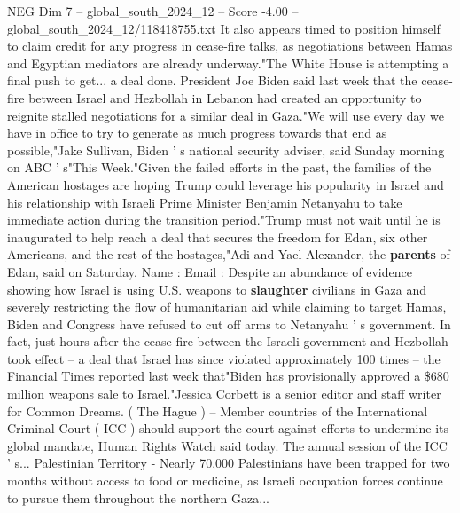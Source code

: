 \begin{textsample}{NEG Dim 7 – global\_south\_2024\_12 – Score -4.00 – global\_south\_2024\_12/118418755.txt}
It also appears timed to position himself to claim credit for any progress in cease-fire talks, as negotiations between Hamas and Egyptian mediators are already underway."The White House is attempting a final push to get... a deal done.
President Joe Biden said last week that the cease-fire between Israel and Hezbollah in Lebanon had created an opportunity to reignite stalled negotiations for a similar deal in Gaza."We will use every day we have in office to try to generate as much progress towards that end as possible,"Jake Sullivan, Biden ' s national security adviser, said Sunday morning on ABC ' s"This Week."Given the failed efforts in the past, the families of the American hostages are hoping Trump could leverage his popularity in Israel and his relationship with Israeli Prime Minister Benjamin Netanyahu to take immediate action during the transition period."Trump must not wait until he is inaugurated to help reach a deal that secures the freedom for Edan, six other Americans, and the rest of the hostages,"Adi and Yael Alexander, the \textbf{parents} of Edan, said on Saturday.
Name : Email : Despite an abundance of evidence showing how Israel is using U.S. weapons to \textbf{slaughter} civilians in Gaza and severely restricting the flow of humanitarian aid while claiming to target Hamas, Biden and Congress have refused to cut off arms to Netanyahu ' s government.
In fact, just hours after the cease-fire between the Israeli government and Hezbollah took effect -- a deal that Israel has since violated approximately 100 times -- the Financial Times reported last week that"Biden has provisionally approved a \$680 million weapons sale to Israel."Jessica Corbett is a senior editor and staff writer for Common Dreams. ( The Hague ) -- Member countries of the International Criminal Court ( ICC ) should support the court against efforts to undermine its global mandate, Human Rights Watch said today.
The annual session of the ICC ' s...
Palestinian Territory - Nearly 70,000 Palestinians have been trapped for two months without access to food or medicine, as Israeli occupation forces continue to pursue them throughout the northern Gaza...

\end{textsample}
